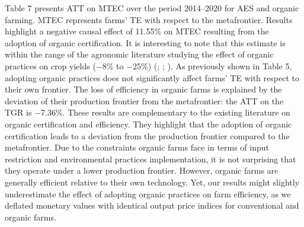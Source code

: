 \begin{Article}
\begin{refsection}[Lassalas]
\begin{table}
\end{table}

Table 7 presents ATT on MTEC over the period 2014--2020 for AES and
organic farming. MTEC represents farms' TE with respect to the
metafrontier. Results highlight a negative causal effect of 11.55\% on
MTEC resulting from the adoption of organic certification. It is
interesting to note that this estimate is within the range of the
agronomic literature studying the effect of organic practices on crop
yields ($-$8\% to $-$25\%) (\textcite{de_ponti_rijk_van_ittersum_2012}; \textcite{seufert_ramankutty_foley_2012}; \textcite{reganold_wachter_2016}). As
previously shown in Table 5, adopting organic practices does not
significantly affect farms' TE with respect to their own frontier. The
loss of efficiency in organic farms is explained by the deviation of
their production frontier from the metafrontier: the ATT on the TGR is
$-$7.36\%. These results are complementary to the existing literature on
organic certification and efficiency. They highlight that the adoption
of organic certification leads to a deviation from the production
frontier compared to the metafrontier. Due to the constraints organic
farms face in terms of input restriction and environmental practices
implementation, it is not surprising that they operate under a lower
production frontier. However, organic farms are generally efficient
relative to their own technology. Yet, our results might slightly
underestimate the effect of adopting organic practices on farm
efficiency, as we deflated monetary values with identical output price
indices for conventional and organic farms. \clearpage


\end{refsection}
\end{Article}
